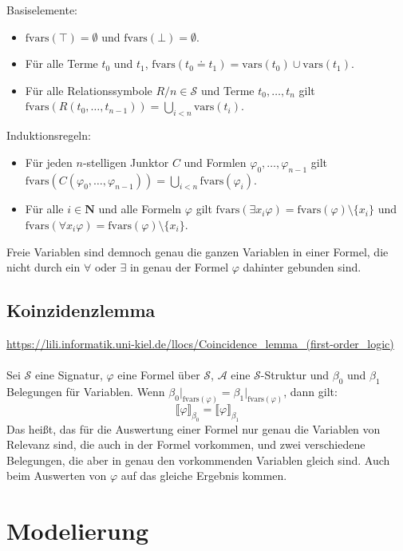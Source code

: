 \documentclass{article}
\begin{document}
    Basiselemente:
    \begin{itemize}
        \item $\text{fvars}(\top) = \emptyset$ und $\text{fvars}(\bot) = \emptyset$.
        \item Für alle Terme $t_0$ und $t_1$, $\text{fvars}(t_0 \doteq t_1) = \text{vars}(t_0) \cup \text{vars}(t_1)$.
        \item Für alle Relationssymbole $R/n \in \mathcal S$ und Terme $t_0, \dots, t_n$ gilt $\text{fvars}(R(t_0, \dots, t_{n-1})) = \bigcup_{i < n} \text{vars}(t_i)$.
    \end{itemize}
    Induktionsregeln:
    \begin{itemize}
        \item Für jeden $n$-stelligen Junktor $C$ und Formlen $\varphi_0, \dots, \varphi_{n-1}$ gilt $\text{fvars}(C(\varphi_0, \dots, \varphi_{n-1})) = \bigcup_{i < n} \text{fvars}(\varphi_i)$.
        \item Für alle $i \in \mathbf N$ und alle Formeln $\varphi$ gilt $\text{fvars}(\exists x_i \varphi) = \text{fvars}(\varphi) \setminus \{x_i\}$ und $\text{fvars}(\forall x_i \varphi) = \text{fvars}(\varphi) \setminus \{x_i\}$.
    \end{itemize}
    Freie Variablen sind demnoch genau die ganzen Variablen in einer Formel, die nicht durch ein $\forall$ oder $\exists$ in genau der Formel $\varphi$ dahinter gebunden sind.

    \subsection{Koinzidenzlemma}
    \url{https://lili.informatik.uni-kiel.de/llocs/Coincidence_lemma_(first-order_logic)}\\\\
    Sei $\mathcal S$ eine Signatur, $\varphi$ eine Formel über $\mathcal S$, $\mathcal A$ eine $\mathcal S$-Struktur und $\beta_0$ und $\beta_1$ Belegungen für Variablen. Wenn $\beta_0\vert_{\text{fvars}(\varphi)} = \beta_1\vert_{\text{fvars}(\varphi)}$, dann gilt:
    $$ \llbracket\varphi\rrbracket_{\beta_0} = \llbracket\varphi\rrbracket_{\beta_1}$$
    Das heißt, das für die Auswertung einer Formel nur genau die Variablen von Relevanz sind, die auch in der Formel vorkommen, und zwei verschiedene Belegungen, die aber in genau den vorkommenden Variablen gleich sind. Auch beim Auswerten von $\varphi$ auf das gleiche Ergebnis kommen.

    \section{Modelierung}
\end{document}
